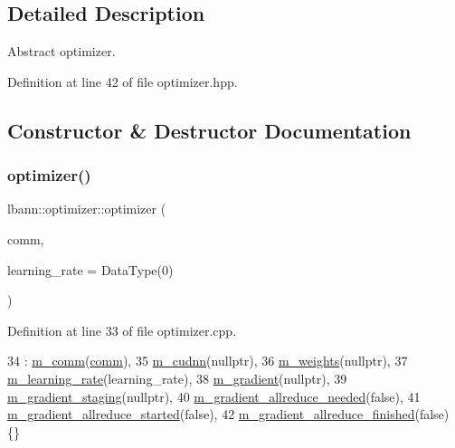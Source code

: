 \subsection{Detailed Description}
Abstract optimizer. 

Definition at line 42 of file optimizer.\+hpp.



\subsection{Constructor \& Destructor Documentation}
\mbox{\label{classlbann_1_1optimizer_a136ed79c3f279ecded5be380fb67b05f}} 
\subsubsection{\texorpdfstring{optimizer()}{optimizer()}\hspace{0.1cm}{\footnotesize\ttfamily [1/2]}}
{\footnotesize\ttfamily lbann\+::optimizer\+::optimizer (\begin{DoxyParamCaption}\item[{\hyperlink{classlbann_1_1lbann__comm}{lbann\+\_\+comm} $\ast$}]{comm,  }\item[{Data\+Type}]{learning\+\_\+rate = {\ttfamily DataType(0)} }\end{DoxyParamCaption})}



Definition at line 33 of file optimizer.\+cpp.


\begin{DoxyCode}
34   : \hyperlink{classlbann_1_1optimizer_a8c2569a8fcf0ee969517067b81896c44}{m\_comm}(\hyperlink{file__io_8cpp_ab048c6f9fcbcfaa57ce68b00263dbebe}{comm}),
35     \hyperlink{classlbann_1_1optimizer_a2f24dbeaca18b06f4aa7d179bbf96680}{m\_cudnn}(\textcolor{keyword}{nullptr}),
36     \hyperlink{classlbann_1_1optimizer_a33b57b578a089d9ffe6715bb3996907c}{m\_weights}(\textcolor{keyword}{nullptr}),
37     \hyperlink{classlbann_1_1optimizer_ad393dcdcb82b44510c586ed5ec46d4dd}{m\_learning\_rate}(learning\_rate),
38     \hyperlink{classlbann_1_1optimizer_a3df20cb0ae2b60430ad4fd235d66c12e}{m\_gradient}(\textcolor{keyword}{nullptr}),
39     \hyperlink{classlbann_1_1optimizer_a92cd058d4f9fc8162d36d52461a96df2}{m\_gradient\_staging}(\textcolor{keyword}{nullptr}),
40     \hyperlink{classlbann_1_1optimizer_a2dc18dcc3cf9510947304c3c5d059eb0}{m\_gradient\_allreduce\_needed}(\textcolor{keyword}{false}),
41     \hyperlink{classlbann_1_1optimizer_ac77740a916f397600efae0c03bc5a045}{m\_gradient\_allreduce\_started}(\textcolor{keyword}{false}),
42     \hyperlink{classlbann_1_1optimizer_a4d332551d05e245ad3f862653b5af65a}{m\_gradient\_allreduce\_finished}(\textcolor{keyword}{false}) \{\}
\end{DoxyCode}
\mbox{\label{classlbann_1_1optimizer_a300aa4928e2e4feeb5e99b9eb0a16632}} 
